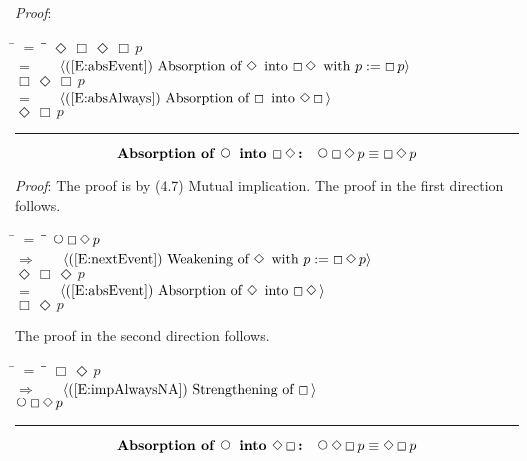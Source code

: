 \documentclass[12pt, fleqn, leqno]{article}
\newcommand{\lgap}{2pt}                             %
\newcommand{\mymathindent}{24pt}                    %
\newcommand{\impl}{\ensuremath{\Rightarrow}}        %
\newcommand{\Next}{\;\,\text{\raisebox{3.5pt}{\circle{6}}}}
\newcommand{\Event}{\Diamond\,}
\newcommand{\Always}{\Box\,}
\newcommand{\myqed}{\rule[-.23ex]{1.2ex}{2.0ex}}
\newcommand{\myqedtab}{\hspace{384pt}}              %
\newcommand{\Gll} {\langle}                         %
\newcommand{\Ggg} {\rangle}                         %
\newcommand{\Hint}[1]     {\ \ \ $\Gll              \mbox{#1} \Ggg$ }   %
\begin{document}
\emph{Proof}:
\begin{tabbing}
\hspace{\mymathindent} \= $= \;$ \= \myqedtab \= \kill
  \> \>   $\Event \Always \Event\Always p$\\[\lgap]
  \> $=$  \>  \Hint{(\ref{E:absEvent}) Absorption of $\Event$ into $\Always\Event$ with $p:=\Always p$}\\[\lgap]
  \> \>   $\Always \Event \Always p$\\[\lgap]
  \> $=$ \> \Hint{(\ref{E:absAlways}) Absorption of $\Always$ into $\Event\Always$}\\[\lgap]
  \> \>   $\Event \Always p$ \quad \myqed
\end{tabbing}
\begin{equation}\label{E:absNextAlwaysEvent}
\textbf{Absorption of $\Next$ into $\Always\Event$:}\quad \Next\Always\Event p \equiv \Always\Event p
\end{equation}

\emph{Proof}: The proof is by (4.7) Mutual implication.
The proof in the first direction follows.
\begin{tabbing}
\hspace{\mymathindent} \= $= \;$ \= \myqedtab \= \kill
  \> \>   $\Next\Always\Event p$\\[\lgap]
  \> $\impl$  \>  \Hint{(\ref{E:nextEvent}) Weakening of $\Event$ with $p := \Always \Event p$}\\[\lgap]
  \> \>   $\Event\Always\Event p$\\[\lgap]
  \> $=$  \>  \Hint{(\ref{E:absEvent}) Absorption of $\Event$ into $\Always\Event$}\\[\lgap]
  \> \>   $\Always\Event p$
\end{tabbing}
The proof in the second direction follows.
\begin{tabbing}
\hspace{\mymathindent} \= $= \;$ \= \myqedtab \= \kill
  \> \>   $\Always\Event p$\\[\lgap]
  \> $\impl$  \>  \Hint{(\ref{E:impAlwaysNA}) Strengthening of $\Always$}\\[\lgap]
  \> \>   $\Next\Always\Event p$ \quad \myqed
\end{tabbing}
\begin{equation}\label{E:absNextEventAlways}
\textbf{Absorption of $\Next$ into $\Event\Always$:}\quad \Next\Event\Always p \equiv \Event\Always p
\end{equation}
\end{document}
